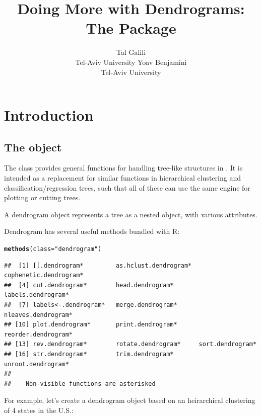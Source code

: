 \documentclass[shortnames,nojss,article]{jss}\usepackage{graphicx, color}
\author{Tal Galili\\Tel-Aviv University \And Yoav Benjamini\\Tel-Aviv University}
\title{Doing More with Dendrograms:\\ The \pkg{dendextend} \proglang{R} Package}
\makeatletter
\newcommand{\hlfunctioncall}[1]{\textcolor[rgb]{0.501960784313725,0,0.329411764705882}{\textbf{#1}}}%
\newcommand{\hlstring}[1]{\textcolor[rgb]{0.6,0.6,1}{#1}}%
\newenvironment{kframe}{%
 \def\at@end@of@kframe{}%
 \ifinner\ifhmode%
  \def\at@end@of@kframe{\end{minipage}}%
  \begin{minipage}{\columnwidth}%
 \fi\fi%
 \def\FrameCommand##1{\hskip\@totalleftmargin \hskip-\fboxsep
 \colorbox{shadecolor}{##1}\hskip-\fboxsep
     \hskip-\linewidth \hskip-\@totalleftmargin \hskip\columnwidth}%
 \MakeFramed {\advance\hsize-\width
   \@totalleftmargin\z@ \linewidth\hsize
   \@setminipage}}%
 {\par\unskip\endMakeFramed%
 \at@end@of@kframe}
\newenvironment{knitrout}{}{} %
\makeatother
\begin{document}
\vspace*{-0.25cm}

\section{Introduction}

\subsection{The  object}


The  class provides general functions for handling tree-like structures in  \citep{R:Main}. It is intended as a replacement for similar functions in hierarchical clustering and classification/regression trees, such that all of these can use the same engine for plotting or cutting trees.

A dendrogram object represents a tree as a nested  object, with various attributes.

Dendrogram has several useful methods bundled with R:

\begin{knitrout}
\color{fgcolor}\begin{kframe}
\begin{alltt}
\hlfunctioncall{methods}(class = \hlstring{"dendrogram"})
\end{alltt}
\begin{verbatim}
##  [1] [[.dendrogram*         as.hclust.dendrogram*  cophenetic.dendrogram*
##  [4] cut.dendrogram*        head.dendrogram*       labels.dendrogram*    
##  [7] labels<-.dendrogram*   merge.dendrogram*      nleaves.dendrogram*   
## [10] plot.dendrogram*       print.dendrogram*      reorder.dendrogram*   
## [13] rev.dendrogram*        rotate.dendrogram*     sort.dendrogram*      
## [16] str.dendrogram*        trim.dendrogram*       unroot.dendrogram*    
## 
##    Non-visible functions are asterisked
\end{verbatim}
\end{kframe}
\end{knitrout}


For example, let's create a dendrogram object based on an heirarchical clustering of 4 states in the U.S.:
\end{document}
